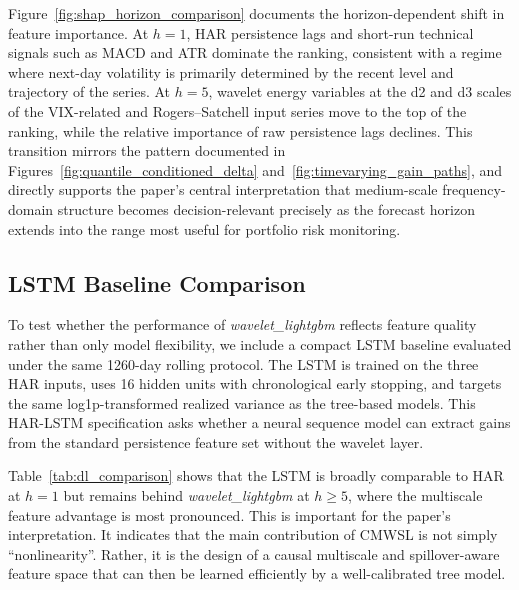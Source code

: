 Figure~\ref{fig:shap_horizon_comparison} documents the horizon-dependent shift in feature importance. At $h=1$, HAR persistence lags and short-run technical signals such as MACD and ATR dominate the ranking, consistent with a regime where next-day volatility is primarily determined by the recent level and trajectory of the series. At $h=5$, wavelet energy variables at the d2 and d3 scales of the VIX-related and Rogers--Satchell input series move to the top of the ranking, while the relative importance of raw persistence lags declines. This transition mirrors the pattern documented in Figures~\ref{fig:quantile_conditioned_delta} and~\ref{fig:timevarying_gain_paths}, and directly supports the paper's central interpretation that medium-scale frequency-domain structure becomes decision-relevant precisely as the forecast horizon extends into the range most useful for portfolio risk monitoring.

\subsection{LSTM Baseline Comparison}
\label{subsec:results_dl}

To test whether the performance of \textit{wavelet\_lightgbm} reflects feature quality rather than only model flexibility, we include a compact LSTM baseline evaluated under the same 1260-day rolling protocol. The LSTM is trained on the three HAR inputs, uses 16 hidden units with chronological early stopping, and targets the same log1p-transformed realized variance as the tree-based models. This HAR-LSTM specification asks whether a neural sequence model can extract gains from the standard persistence feature set without the wavelet layer.



Table~\ref{tab:dl_comparison} shows that the LSTM is broadly comparable to HAR at \(h=1\) but remains behind \textit{wavelet\_lightgbm} at \(h\ge 5\), where the multiscale feature advantage is most pronounced. This is important for the paper's interpretation. It indicates that the main contribution of CMWSL is not simply ``nonlinearity''. Rather, it is the design of a causal multiscale and spillover-aware feature space that can then be learned efficiently by a well-calibrated tree model.
